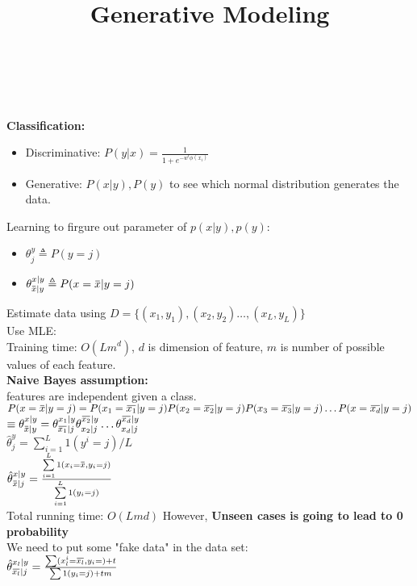 \documentclass[12pt]{article}
\newcommand{\overbar}[1]{\mkern 1.5mu\overline{\mkern-1.5mu#1\mkern-1.5mu}\mkern 1.5mu}
\begin{document}
        \title{Generative Modeling}\\
        \maketitle\\
        \textbf{Classification:} 
        \begin{itemize}
            \item Discriminative: $P(y|x) = \frac{1}{1 + e^{-w^t\phi(x_i)}}$
            \item Generative: $P(x | y), P(y)$ to see which normal distribution generates the data.
        \end{itemize}
        Learning to firgure out parameter of $p(x|y), p(y)$:
        \begin{itemize}
            \item $\theta_j^y \triangleq P(y = j)$
            \item $\theta_{\overbar{x} | y}^{x|y} \triangleq P(x = \overbar{x} | y = j)$
        \end{itemize}
        Estimate data using $D = \{(x_1, y_1), (x_2, y_2) \dots, (x_L, y_L)\}$\\
        Use MLE:\\
        Training time: $O(Lm^d)$, $d$ is dimension of feature, $m$ is number of possible values of each feature.\\
        \textbf{Naive Bayes assumption:}\\
        features are independent given a class. \\
        $P(x = \overbar{x} | y = j) = P(x_1 = \overbar{x_1}|y = j)P(x_2 = \overbar{x_2}|y = j)P(x_3 = \overbar{x_3}|y = j) \dots P(x = \overbar{x_d}|y = j)$\\
        $\equiv  \theta^{x | y}_{\overbar{x} | y} = \theta^{x_1 | y}_{\overbar{x_1} | j}\theta^{\overbar{x_2} | y}_{x_2 | j} \dots \theta^{\overbar{x_d} | y}_{x_d | j}$\\
        $\hat{\theta}_j^y = \sum_{i=1}^{L}1(y^i=j)/L$\\
        $\hat{\theta}_{\overbar{x}|j}^{x|y} = \frac{\sum\limits_{i = 1}^L1(x_i = \overbar{x}, y_i = j)}{\sum\limits_{i = 1}^{L}1(y_i = j)}$\\
        Total running time: $O(Lmd)$
        However, \textbf{Unseen cases is going to lead to 0 probability}\\
        We need to put some "fake data" in the data set:\\
        $\hat{\theta}^{x_l|y}_{\overbar{x_l}|j} = \frac{\sum(x_l^i= \overbar{x_l}, y_i = ) + t}{\sum 1(y_i = j) + tm}$\\
\end{document}
